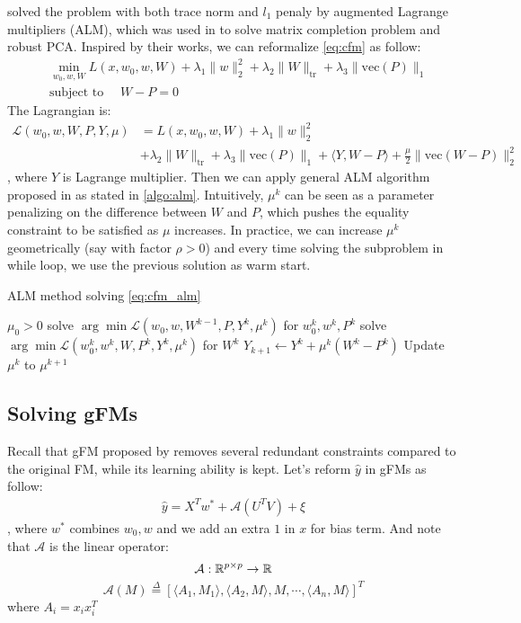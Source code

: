 \documentclass{article}
\newcommand{\tr}{\text{tr}}
\newcommand{\vecc}{\text{vec}}
\begin{document}
\cite{li2015conformal} solved the problem with both trace norm and $l_1$ penaly by augmented Lagrange multipliers (ALM), which was used in \cite{lin2010augmented} to solve matrix completion problem and robust PCA. Inspired by their works, we can reformalize \cref{eq:cfm} as follow:
\begin{align}
  &\min_{w_0, w, W} L(x, w_0, w, W) + \lambda_1 \|w\|_2^2 + \lambda_2 \|W\|_{\tr} + \lambda_3 \|\vecc(P)\|_1 \label{eq:cfm_alm} \\
  & \text{subject to }\quad W - P = 0
\end{align}
The Lagrangian is:
\begin{align}
  \mathcal{L}(w_0, w, W, P, Y, \mu) &= L(x, w_0, w, W) + \lambda_1 \|w\|_2^2 \nonumber \\
  &+ \lambda_2 \|W\|_{\tr} + \lambda_3 \|\vecc(P)\|_1 + \langle Y, W - P \rangle + \frac{\mu}{2} \|\vecc(W - P)\|_2^2 \label{eq:alm}
\end{align}
, where $Y$ is Lagrange multiplier. Then we can apply general ALM algorithm proposed in \cite{lin2010augmented} as stated in \cref{algo:alm}. Intuitively, $\mu^k$ can be seen as a parameter penalizing on the difference between $W$ and $P$, which pushes the equality constraint to be satisfied as $\mu$ increases. In practice, we can increase $\mu^k$ geometrically (say with factor $\rho > 0$) and every time solving the subproblem in while loop, we use the previous solution as warm start.
\begin{algorithm} 
  \caption{ALM method solving \cref{eq:cfm_alm}}
  \label{algo:alm}
  \begin{algorithmic}[1]
    \STATE $\mu_0 > 0$
      \STATE solve $\arg\min \mathcal{L}(w_0, w, W^{k-1}, P, Y^k, \mu^k)$ for $w_{0}^k, w^k, P^k$
      \STATE solve $\arg\min \mathcal{L}(w_{0}^k, w^k, W, P^k, Y^k, \mu^k)$ for $W^k$
      \STATE $Y_{k + 1} \leftarrow Y^{k} + \mu^k (W^k - P^k)$
      \STATE Update $\mu^k$ to $\mu^{k+1}$
    \ENDWHILE
  \end{algorithmic}
\end{algorithm}

\subsection{Solving gFMs}
 
 
Recall that gFM proposed by \cite{generalizedFM_paper} removes several redundant constraints compared to the original FM, while its learning ability is kept. Let's reform $\hat{y}$ in gFMs as follow:
\begin{align}
\hat{y}=X^Tw^*+\mathcal{A}(U^TV)+\xi \label{eq:one_pass_gfm}
\end{align}
, where $w^*$ combines $w_0, w$ and we add an extra $1$ in $x$ for bias term. And note that $\mathcal{A}$ is the linear operator:$$
\mathcal{A} : \mathbb{R}^{p\times p} \rightarrow \mathbb{R} \\$$ $$ \mathcal{A}(M) \overset{\Delta}{=} \left[\langle A_1, M_1\rangle,\langle A_2, M\rangle, M, \cdots ,\langle A_n, M\rangle\right]^T$$
where $A_i = x_ix_i^T$
 
\end{document}
